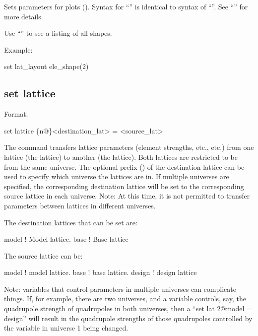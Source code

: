 {{Sets parameters for  plots ().  Syntax for ``'' is
identical to syntax of ``''.  See ``'' for more details.

Use ``'' to see a listing of all shapes. 

Example:
\begin{example}
  set lat_layout ele_shape(2)%
\end{example}


\subsection{set lattice}
\label{s:set.lattice}

Format:
\begin{example}
  set lattice \{n@\}<destination_lat> = <source_lat>
\end{example}

The  command transfers lattice parameters (element strengths, etc., etc.)  from one
lattice (the  lattice) to another (the  lattice). Both lattices are
restricted to be from the same universe. The optional  prefix () of the
destination lattice can be used to specify which universe the lattices are in. If multiple universes
are specified, the corresponding destination lattice will be set to the corresponding source lattice
in each universe. Note: At this time, it is not permitted to transfer parameters between lattices in
different universes.

The destination lattices that can be set are:
\begin{example}
  model      ! Model lattice.
  base       ! Base lattice
\end{example}
The source lattice can be:
\begin{example}
  model       ! model lattice.
  base        ! base lattice.
  design      ! design lattice
\end{example}

Note: \tao variables that control parameters in multiple universes can complicate things. If, for
example, there are two universes, and a \tao variable controls, say, the quadrupole strength of
quadrupoles in both universes, then a ``set lat 2@model = design'' will result in the quadrupole
strengths of those quadrupoles controlled by the variable in universe 1 being changed.

}}
